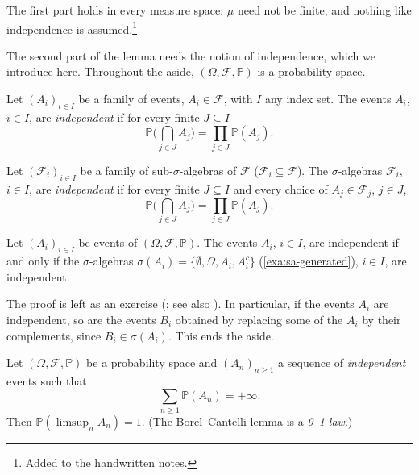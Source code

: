 The first part holds in every measure space: $\mu$ need not be finite, and nothing like
independence is assumed.\footnote{Added to the handwritten notes.}

\begin{remark}\label{rem:ms-aside-independence}
The second part of the lemma needs the notion of independence, which we introduce here.
Throughout the aside, $(\Omega,\mathcal F,\mathbb P)$ is a probability space.
\end{remark}

\begin{definition}\label{def:ms-independence}
Let $(A_i)_{i\in I}$ be a family of events, $A_i\in\mathcal F$, with $I$ any index set. The
events $A_i$, $i\in I$, are \emph{independent} if for every finite $J\subseteq I$
\[
  \mathbb P\Big(\bigcap_{j\in J}A_j\Big)=\prod_{j\in J}\mathbb P(A_j).
\]
\end{definition}

\begin{definition}\label{def:ms-independence-sigma}
Let $(\mathcal F_i)_{i\in I}$ be a family of sub-$\sigma$-algebras of $\mathcal F$
($\mathcal F_i\subseteq\mathcal F$). The $\sigma$-algebras $\mathcal F_i$, $i\in I$, are
\emph{independent} if for every finite $J\subseteq I$ and every choice of $A_j\in\mathcal F_j$,
$j\in J$,
\[
  \mathbb P\Big(\bigcap_{j\in J}A_j\Big)=\prod_{j\in J}\mathbb P(A_j).
\]
\end{definition}

\begin{proposition}\label{prop:ms-independence-generated}
Let $(A_i)_{i\in I}$ be events of $(\Omega,\mathcal F,\mathbb P)$. The events $A_i$,
$i\in I$, are independent if and only if the $\sigma$-algebras
$\sigma(A_i)=\{\emptyset,\Omega,A_i,A_i^c\}$ (\cref{exa:sa-generated}), $i\in I$, are
independent.
\end{proposition}

The proof is left as an exercise (; see also
\citet[Section~4]{billingsley}). In particular, if the events $A_i$ are independent, so are
the events $B_i$ obtained by replacing some of the $A_i$ by their complements, since
$B_i\in\sigma(A_i)$. This ends the aside.

\begin{lemma}\label{lem:ms-borel-cantelli-2}
Let $(\Omega,\mathcal F,\mathbb P)$ be a probability space and $(A_n)_{n\ge1}$ a sequence of
\emph{independent} events such that
\[
  \sum_{n\ge1}\mathbb P(A_n)=+\infty .
\]
Then $\mathbb P(\limsup_nA_n)=1$. (The Borel--Cantelli lemma is a \emph{0--1 law}.)
\end{lemma}

